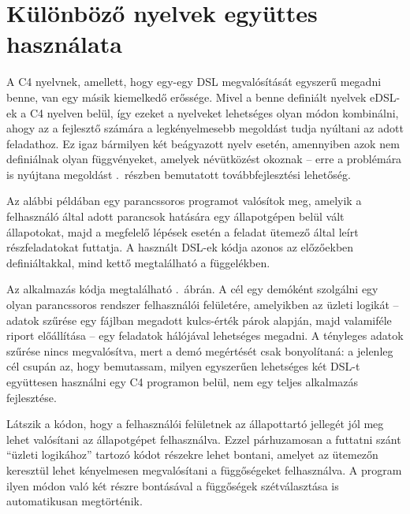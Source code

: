 \section{Különböző nyelvek együttes használata}\label{sec:uses:mix}

A C4 nyelvnek, amellett, hogy egy-egy \gls{DSL} megvalósítását egyszerű megadni benne, van egy másik kiemelkedő erőssége.
Mivel a benne definiált nyelvek \gls{eDSL}-ek a C4 nyelven belül, így ezeket a nyelveket lehetséges olyan módon kombinálni, ahogy az a fejlesztő számára a legkényelmesebb megoldást tudja nyúltani az adott feladathoz.
Ez igaz bármilyen két beágyazott nyelv esetén, amennyiben azok nem definiálnak olyan függvényeket, amelyek névütközést okoznak -- erre a problémára is nyújtana megoldást .~részben bemutatott továbbfejlesztési lehetőség.

Az alábbi példában egy parancssoros programot valósítok meg, amelyik a felhasználó által adott parancsok hatására egy állapotgépen belül vált állapotokat, majd a megfelelő lépések esetén a feladat ütemező által leírt részfeladatokat futtatja.
A használt \gls{DSL}-ek kódja azonos az előzőekben definiáltakkal, mind kettő megtalálható a függelékben.

Az alkalmazás kódja megtalálható .~ábrán.
A cél egy demóként szolgálni egy olyan parancssoros rendszer felhasználói felületére, amelyikben az üzleti logikát -- adatok szűrése egy fájlban megadott kulcs-érték párok alapján, majd valamiféle riport előállítása -- egy feladatok hálójával lehetséges megadni.
A tényleges adatok szűrése nincs megvalósítva, mert a demó megértését csak bonyolítaná: a jelenleg cél csupán az, hogy bemutassam, milyen egyszerűen lehetséges két \gls{DSL}-t együttesen használni egy C4 programon belül, nem egy teljes alkalmazás fejlesztése.

Látszik a kódon, hogy a felhasználói felületnek az állapottartó jellegét jól meg lehet valósítani az állapotgépet felhasználva.
Ezzel párhuzamosan a futtatni szánt ``üzleti logikához'' tartozó kódot részekre lehet bontani, amelyet az ütemezőn keresztül lehet kényelmesen megvalósítani a függőségeket felhasználva.
A program ilyen módon való két részre bontásával a függőségek szétválasztása is automatikusan megtörténik.

